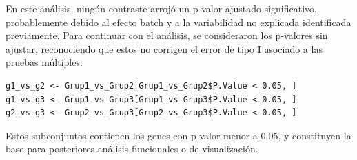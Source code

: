 \documentclass[12pt,a4paper]{article}
\begin{document}
En este análisis, ningún contraste arrojó un p-valor ajustado significativo, probablemente debido al efecto batch y a la variabilidad no explicada identificada previamente. Para continuar con el análisis, se consideraron los p-valores sin ajustar, reconociendo que estos no corrigen el error de tipo I asociado a las pruebas múltiples:

\begin{verbatim}
g1_vs_g2 <- Grup1_vs_Grup2[Grup1_vs_Grup2$P.Value < 0.05, ]
g1_vs_g3 <- Grup1_vs_Grup3[Grup1_vs_Grup3$P.Value < 0.05, ]
g2_vs_g3 <- Grup2_vs_Grup3[Grup2_vs_Grup3$P.Value < 0.05, ]
\end{verbatim}




Estos subconjuntos contienen los genes con p-valor menor a 0.05, y constituyen la base para posteriores análisis funcionales o de visualización.
\end{document}
